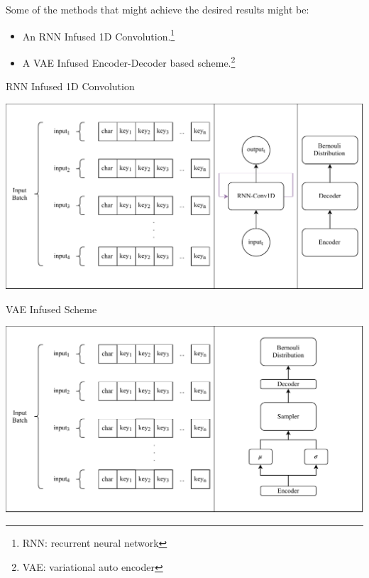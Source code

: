 \documentclass[a4paper, 12pt]{report}
\begin{document}
Some of the methods that might achieve the desired results might be:
\begin{itemize}
	\item An RNN Infused 1D Convolution.\footnote{RNN: recurrent neural network}
	\item A VAE Infused Encoder-Decoder based scheme.\footnote{VAE: variational auto encoder}
\end{itemize}
\newpage
\begin{blockfigure}{RNN Infused 1D Convolution}
	\begin{center}
		\includegraphics[width = \textwidth]{suggestion_rnn_conv1d}
	\end{center}
\end{blockfigure}
\begin{blockfigure}{VAE Infused Scheme}
	\begin{center}
		\includegraphics[width = \textwidth]{suggestion_vae}
	\end{center}
\end{blockfigure}
\newpage
\end{document}

